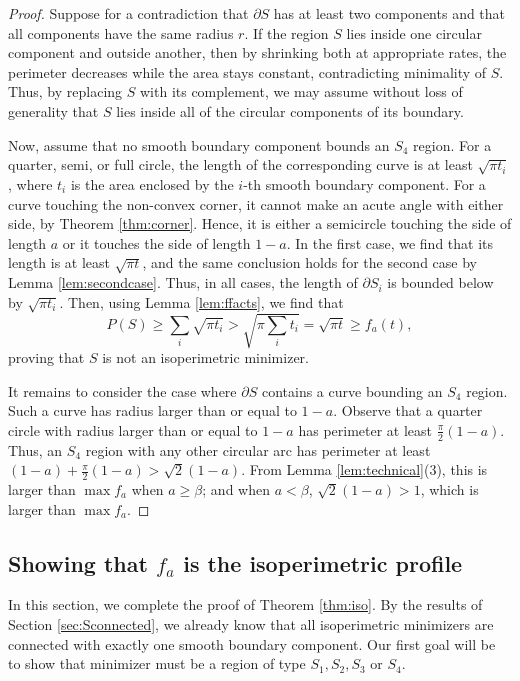 \documentclass[leqno]{article}
\numberwithin{equation}{section}
\theoremstyle{definition}
\theoremstyle{remark}
\theoremstyle{plain}
\begin{document}
\begin{proof} Suppose for a contradiction that $\partial S$ has at least two components and that all components have the same radius $r$. If the region $S$ lies inside one circular component and outside another, then by shrinking both at appropriate rates, the perimeter decreases while the area stays constant, contradicting minimality of $S$.  Thus, by replacing $S$ with its complement, we may assume without loss of generality that $S$ lies inside all of the circular components of its boundary.


Now, assume that no smooth boundary component bounds an $S_4$ region.  For a quarter, semi, or full circle, the length of the corresponding curve is at least $\sqrt{\pi t_i}$, where $t_i$ is the area enclosed by the $i$-th smooth boundary component.  For a curve touching the non-convex corner, it cannot make an acute angle with either side, by Theorem \ref{thm:corner}. Hence, it is either a semicircle touching the side of length $a$ or it touches the side of length $1-a$. In the first case, we find that its length is at least $\sqrt{\pi t}$, and the same conclusion holds for the second case by Lemma \ref{lem:secondcase}. Thus, in all cases, the length of $\partial S_i$ is bounded below by $\sqrt{\pi t_i}$.  Then, using Lemma \ref{lem:ffacts}, we find that
 $$P(S)  \geq \sum_i \sqrt{\pi t_i}  > \sqrt{\pi \sum_i t_i} = \sqrt{\pi t} \geq f_a(t),$$ proving that $S$ is not an isoperimetric minimizer.

It remains to consider the case where $\partial S$ contains a curve bounding an $S_4$ region. Such a curve has radius larger than or equal to $1-a$.  Observe that a quarter circle with radius larger than or equal to $1-a$ has perimeter at least $\frac{\pi}{2}(1-a)$.  Thus, an $S_4$ region with any other circular arc has perimeter at least $(1-a) + \frac{\pi}{2}(1-a) > \sqrt{2}(1-a)$.  From Lemma \ref{lem:technical}(3), this is larger than $\max f_a$ when $a\geq \beta$; and when $a < \beta$, $\sqrt{2}(1-a) > 1$, which is larger than $\max f_a$. 


\end{proof}


\subsection{\texorpdfstring{Showing that $f_a$ is the isoperimetric profile}{Showing fa is the isoperimetric profile}}\label{sec:faiso}

In this section, we complete the proof of Theorem \ref{thm:iso}.  By the results of Section \ref{sec:Sconnected}, we already know that all isoperimetric minimizers are connected with exactly one smooth boundary component. Our first goal will be to show that minimizer must be a region of type $S_1,S_2,S_3$ or $S_4$. 
\end{document}
